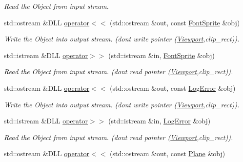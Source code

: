 \begin{DoxyCompactItemize}
\begin{DoxyCompactList}\small\item\em Read the Object from input stream. \item\end{DoxyCompactList}\item 
std::ostream \&DLL \hyperlink{namespace_f2_c_a1e443bfd91754c8b4bb57352fe90321d}{operator$<$$<$} (std::ostream \&out, const \hyperlink{class_f2_c_1_1_font_sprite}{FontSprite} \&obj)
\begin{DoxyCompactList}\small\item\em Write the Object into output stream. (dont write pointer (\hyperlink{class_f2_c_1_1_viewport}{Viewport},clip\_\-rect)). \item\end{DoxyCompactList}\item 
std::istream \&DLL \hyperlink{namespace_f2_c_abc3146c5521af4e054bc4fd35da2c959}{operator$>$$>$} (std::istream \&in, \hyperlink{class_f2_c_1_1_font_sprite}{FontSprite} \&obj)
\begin{DoxyCompactList}\small\item\em Read the Object from input stream. (dont read pointer (\hyperlink{class_f2_c_1_1_viewport}{Viewport},clip\_\-rect)). \item\end{DoxyCompactList}\item 
std::ostream \&DLL \hyperlink{namespace_f2_c_a267c518052694773ad15076bdf73c006}{operator$<$$<$} (std::ostream \&out, const \hyperlink{class_f2_c_1_1_log_error}{LogError} \&obj)
\begin{DoxyCompactList}\small\item\em Write the Object into output stream. (dont write pointer (\hyperlink{class_f2_c_1_1_viewport}{Viewport},clip\_\-rect)). \item\end{DoxyCompactList}\item 
std::istream \&DLL \hyperlink{namespace_f2_c_af2a0fbba37af3caf4c9ec3947425e013}{operator$>$$>$} (std::istream \&in, \hyperlink{class_f2_c_1_1_log_error}{LogError} \&obj)
\begin{DoxyCompactList}\small\item\em Read the Object from input stream. (dont read pointer (\hyperlink{class_f2_c_1_1_viewport}{Viewport},clip\_\-rect)). \item\end{DoxyCompactList}\item 
std::ostream \&DLL \hyperlink{namespace_f2_c_a16eb879878bd2384be0b44f3b8f51a22}{operator$<$$<$} (std::ostream \&out, const \hyperlink{class_f2_c_1_1_plane}{Plane} \&obj)

\end{DoxyCompactItemize}
